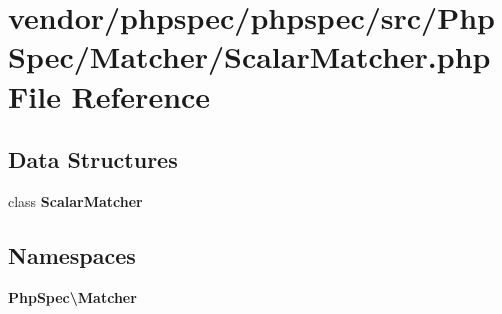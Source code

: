 \section{vendor/phpspec/phpspec/src/\+Php\+Spec/\+Matcher/\+Scalar\+Matcher.php File Reference}
\label{_scalar_matcher_8php}
\subsection*{Data Structures}
\begin{DoxyCompactItemize}
\item 
class {\bf Scalar\+Matcher}
\end{DoxyCompactItemize}
\subsection*{Namespaces}
\begin{DoxyCompactItemize}
\item 
 {\bf Php\+Spec\textbackslash{}\+Matcher}
\end{DoxyCompactItemize}
